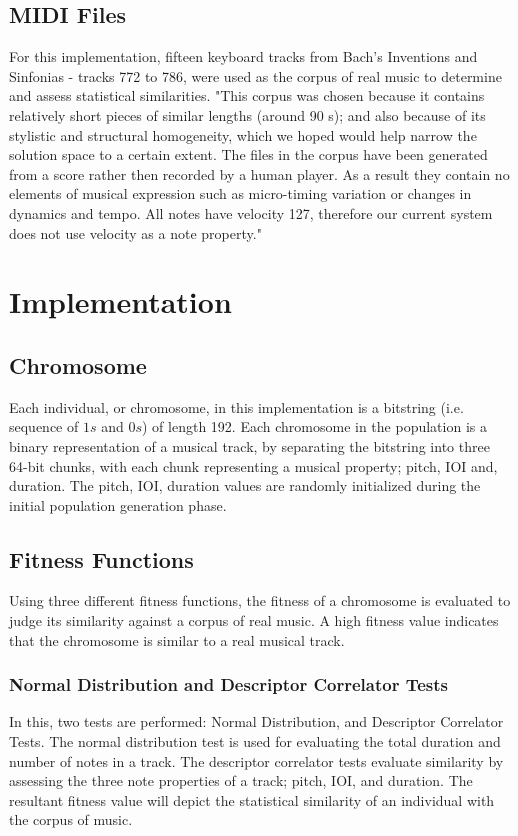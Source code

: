 \documentclass[conference]{IEEEtran}
\begin{document}
\subsection{MIDI Files}
For this implementation, fifteen keyboard tracks from Bach's Inventions and Sinfonias - tracks 772 to 786, were used as the corpus of real music to determine and assess statistical similarities. "This corpus was chosen because it contains relatively short pieces of similar lengths (around 90 s); and also because of its stylistic and structural homogeneity, which we hoped would help narrow the solution space to a certain extent. The files in the corpus have been generated from a score rather then recorded by a human player. As a result they contain no elements of musical expression such as micro-timing variation or changes in dynamics and tempo. All notes have velocity 127, therefore our current system does not use velocity as a note property." \cite{b1}
\section{Implementation}


\subsection{Chromosome}
Each individual, or chromosome, in this implementation is a bitstring (i.e. sequence of $1s$ and $0s$) of length 192. Each chromosome in the population is a binary representation of a musical track, by separating the bitstring into three 64-bit chunks, with each chunk representing a musical property; pitch, IOI and, duration. The pitch, IOI, duration values are randomly initialized during the initial population generation phase.


\subsection{Fitness Functions}
Using three different fitness functions, the fitness of a chromosome is evaluated to judge its similarity against a corpus of real music. A high fitness value indicates that the chromosome is similar to a real musical track.

\subsubsection{Normal Distribution and Descriptor Correlator Tests}
In this, two tests are performed: Normal Distribution, and Descriptor Correlator Tests. The normal distribution test is used for evaluating the total duration and number of notes in a track. The descriptor correlator tests evaluate similarity by assessing the three note properties of a track; pitch, IOI, and duration. The resultant fitness value will depict the statistical similarity of an individual with the corpus of music. \cite{b1}
\end{document}
